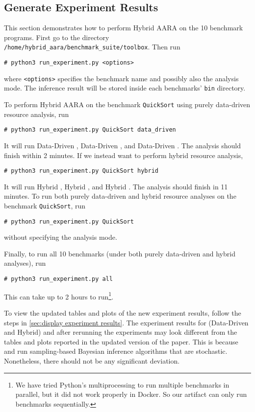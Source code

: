 \subsection{Generate Experiment Results}
\label{sec:generate experiment results}

This section demonstrates how to perform Hybrid AARA on the 10 benchmark
programs.
%
First go to the directory \texttt{/home/hybrid\_aara/benchmark\_suite/toolbox}.
%
Then run
\begin{verbatim}
# python3 run_experiment.py <options>
\end{verbatim}
where \texttt{<options>} specifies the benchmark name and possibly also the
analysis mode.
%
The inference result will be stored inside each benchmarks' \texttt{bin}
directory.

To perform Hybrid AARA on the benchmark \texttt{QuickSort} using purely
data-driven resource analysis, run
\begin{verbatim}
# python3 run_experiment.py QuickSort data_driven
\end{verbatim}
%
It will run Data-Driven \Opt{}, Data-Driven \BayesWC{}, and Data-Driven
\BayesPC{}.
%
The analysis should finish within 2 minutes.
%
If we instead want to perform hybrid resource analysis,
\begin{verbatim}
# python3 run_experiment.py QuickSort hybrid
\end{verbatim}
%
It will run Hybrid \Opt{}, Hybrid \BayesWC{}, and Hybrid \BayesPC{}.
%
The analysis should finish in 11 minutes.
%
To run both purely data-driven and hybrid resource analyses on the benchmark
\texttt{QuickSort}, run
\begin{verbatim}
# python3 run_experiment.py QuickSort
\end{verbatim}
without specifying the analysis mode.

Finally, to run all 10 benchmarks (under both purely data-driven and hybrid
analyses), run
\begin{verbatim}
# python3 run_experiment.py all
\end{verbatim}
This can take up to 2 hours to run\footnote{We have tried Python's
multiprocessing to run multiple benchmarks in parallel, but it did not work
properly in Docker. So our artifact can only run benchmarks sequentially.}.

To view the updated tables and plots of the new experiment results, follow the
steps in \cref{sec:display experiment results}.
%
The experiment results for (Data-Driven and Hybrid) \BayesWC{} and \BayesPC{}
after rerunning the experiments may look different from the tables and plots
reported in the updated version of the paper.
%
This is because \BayesWC{} and \BayesPC{} run sampling-based Bayesian inference
algorithms that are stochastic.
%
Nonetheless, there should not be any significant deviation.

